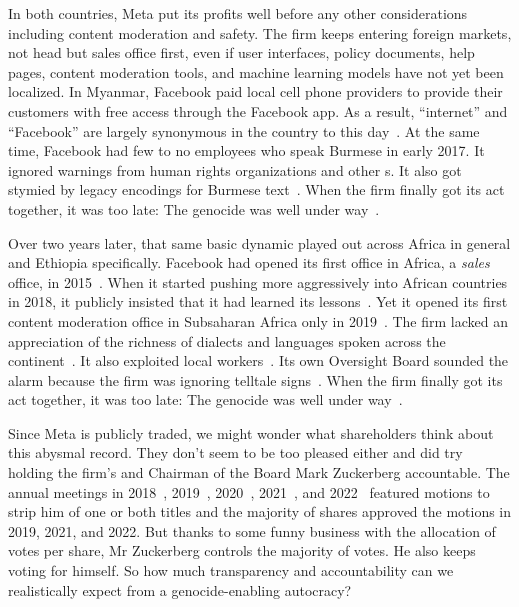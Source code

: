 In both countries, Meta put its profits well before any other considerations
including content moderation and safety. The firm keeps entering foreign
markets, not head but sales office first, even if user interfaces, policy
documents, help pages, content moderation tools, and machine learning models
have not yet been localized. In Myanmar, Facebook paid local cell phone
providers to provide their customers with free access through the Facebook app.
As a result, ``internet'' and ``Facebook'' are largely synonymous in the country
to this day~\cite{Strom2016}. At the same time, Facebook had few to no employees
who speak Burmese in early 2017. It ignored warnings from human rights
organizations and other s. It also got stymied by legacy encodings for
Burmese text~\cite{LaGrowPruzan2019,Wade2022}. When the firm finally got its act
together, it was too late: The genocide was well under
way~\cite{McLaughlin2018,MilkoOrtutay2022,Mozur2018,Ortutay2022}.

Over two years later, that same basic dynamic played out across Africa in
general and Ethiopia specifically. Facebook had opened its first office in
Africa, a \emph{sales} office, in 2015~\cite{Wagner2015}. When it started
pushing more aggressively into African countries in 2018, it publicly insisted
that it had learned its lessons~\cite{Tiku2018}. Yet it opened its first content
moderation office in Subsaharan Africa only in 2019~\cite{Agutu2019}. The firm
lacked an appreciation of the richness of dialects and languages spoken across
the continent~\cite{FickDave2019,JacksonTownsendea2022,Madung2021}. It also
exploited local workers~\cite{AlSibai2022,Perrigo2022,Perrigo2023}. Its own
Oversight Board sounded the alarm because the firm was ignoring telltale
signs~\cite{Faife2021}. When the firm finally got its act together, it was too
late: The genocide was well under
way~\cite{Allen2022,Gilbert2020,GlobalWitness2022,Ilori2020,Malik2022,ElliottChristopherea2021,ZelalemGuest2021,RobinsEarly2021}.

Since Meta is publicly traded, we might wonder what shareholders think about
this abysmal record. They don't seem to be too pleased either and did try
holding the firm's  and Chairman of the Board Mark Zuckerberg
accountable. The annual meetings in 2018~\cite{Butler2018},
2019~\cite{Sumagaysay2019}, 2020~\cite{McRitchie2020}, 2021~\cite{Nix2021}, and
2022~\cite{WatersAgnew2022} featured motions to strip him of one or both titles
and the majority of shares approved the motions in 2019, 2021, and 2022. But
thanks to some funny business with the allocation of votes per share, Mr
Zuckerberg controls the majority of votes. He also keeps voting for himself. So
how much transparency and accountability can we realistically expect from a
genocide-enabling autocracy?
